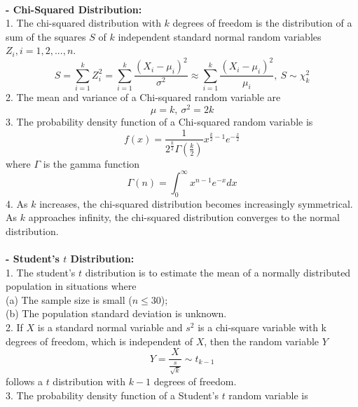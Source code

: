 \documentclass{article}
\begin{document}
\begin{enumerate}[S1 - ]
\begin{equation*}
    \end{equation*}
    \\
    \textbf{- Chi-Squared Distribution:}\\
    1. The chi-squared distribution with $k$ degrees of freedom is the distribution of a sum of the squares $S$ of $k$ independent standard normal random variables $Z_i, i=1,2,...,n$.
    \begin{equation*}
    S = \sum_{i=1}^{k} Z_{i}^{2} =  \sum_{i=1}^{k} \frac{(X_i-\mu_i)^2}{\sigma^2} \approx  \sum_{i=1}^{k} \frac{(X_i-\mu_i)^2}{\mu_i}, \ S\sim \chi_{k}^{2}
    \end{equation*}
    2. The mean and variance of a Chi-squared random variable are
    \begin{equation*}
    \mu = k, \ \sigma^2 = 2k
    \end{equation*}
    3. The probability density function of a Chi-squared random variable is
    \begin{equation*}
    f(x) = \frac{1}{2^\frac{k}{2}\Gamma(\frac{k}{2})}x^{\frac{k}{2}-1}e^{-\frac{x}{2}}
    \end{equation*}
    where $\Gamma$ is the gamma function
    \begin{equation*}
    \Gamma(n) = \int_{0}^{\infty} x^{n-1}e^{-x}dx
    \end{equation*}
    4. As $k$ increases, the chi-squared distribution becomes increasingly symmetrical. As $k$ approaches infinity, the chi-squared distribution
    converges to the normal distribution.\\
    \\
    \textbf{- Student's $t$ Distribution:}\\
    1. The student's $t$ distribution is to estimate the mean of a normally distributed population in situations where\\
    (a) The sample size is small ($n \leq 30$);\\
    (b) The population standard deviation is unknown.\\
    2. If $X$ is a standard normal variable and $s^2$ is a chi-square variable with k degrees of freedom, which is independent of $X$, then the
    random variable $Y$
    \begin{equation*}
    Y = \frac{X}{\frac{s}{\sqrt{k}}} \sim t_{k-1}
    \end{equation*}
    follows a $t$ distribution with $k-1$ degrees of freedom.\\
    3. The probability density function of a Student's $t$ random variable is
    \begin{equation*}

\end{equation*}
\end{enumerate}
\end{document}
